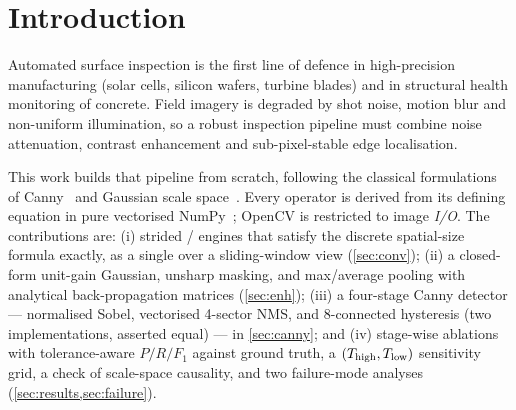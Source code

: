 \section{Introduction}
\label{sec:intro}

Automated surface inspection is the first line of defence in high-precision
manufacturing (solar cells, silicon wafers, turbine blades) and in structural
health monitoring of concrete. Field imagery is degraded by shot noise, motion
blur and non-uniform illumination, so a robust inspection pipeline must combine
noise attenuation, contrast enhancement and sub-pixel-stable edge localisation.

This work builds that pipeline from scratch, following the classical
formulations of Canny~\cite{canny1986} and Gaussian scale
space~\cite{witkin1983,lindeberg1994}. Every operator is derived from its
defining equation in pure vectorised NumPy~\cite{harris2020numpy}; OpenCV is
restricted to image \emph{I/O}. The contributions are:
(i) strided / engines that satisfy the discrete
spatial-size formula exactly, as a single  over a sliding-window
view (\cref{sec:conv}); (ii) a closed-form unit-gain Gaussian, unsharp masking,
and max/average pooling with analytical back-propagation matrices
(\cref{sec:enh}); (iii) a four-stage Canny detector --- normalised Sobel,
vectorised 4-sector NMS, and 8-connected hysteresis (two implementations,
asserted equal) --- in \cref{sec:canny}; and (iv) stage-wise ablations with
tolerance-aware $P/R/F_1$ against ground truth, a $(T_{\text{high}},T_{\text{low}})$ sensitivity
grid, a check of scale-space causality, and two failure-mode analyses
(\cref{sec:results,sec:failure}).
